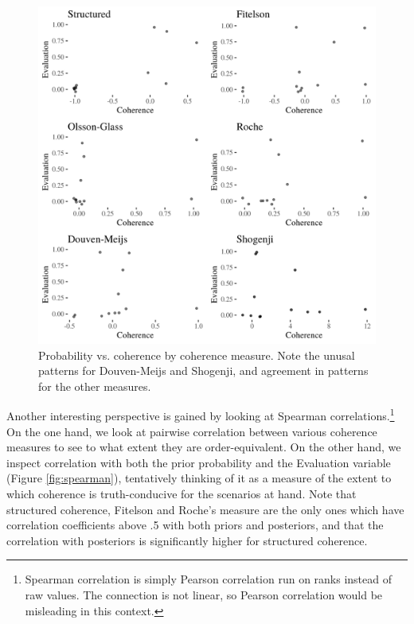 \documentclass[10pt,]{scrartcl}
\begin{document}
\begin{figure}[H]\centering
    \includegraphics{../images/cohPlots.png}
    \caption{Probability vs. coherence by coherence measure. Note the unusal patterns for Douven-Meijs and Shogenji, and agreement in patterns for the other measures.}
    \label{fig:cohplot}
\end{figure}







Another interesting perspective is gained by looking at Spearman correlations.\footnote{Spearman correlation is simply Pearson correlation run on ranks instead of raw values. The connection is not linear, so Pearson correlation would be misleading in this context.} On the one hand, we look at  pairwise correlation between various coherence measures to see to what extent they are order-equivalent. On the other hand, we inspect correlation  with both the prior probability and the Evaluation variable (Figure \ref{fig:spearman}), tentatively thinking of it as a measure of the extent to which coherence is truth-conducive for the scenarios at hand.  Note that structured coherence, Fitelson and Roche's measure are the only ones which have correlation coefficients above .5 with both priors and posteriors, and that the correlation with posteriors is significantly higher for structured coherence.  
\end{document}
